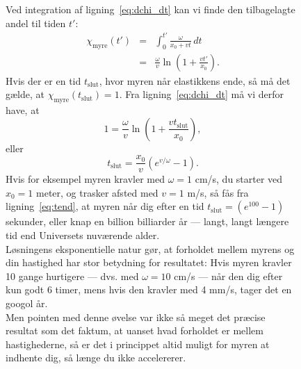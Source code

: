 \documentclass[useAMS,danish]{aa}
\begin{document}
\begin{figure}[!t]
\begin{bclogo}[
    couleur=gray!20,
    epBord=1,
    arrondi=0.1,
    logo=\bcinfo,
    marge=8,
    ombre=false, %
    couleurBord=gray!60,
    barre=line]
{{    Ved integration af ligning~\ref{eq:dchi_dt} kan vi finde den tilbagelagte andel til tiden $t'$:
    \begin{eqnarray}
        \label{eq:chit}
        \nonumber
        \chi_\mathrm{myre}(t') & = & \int_0^{t'} \frac{\omega}{x_0 + v t} \, dt\\
                               & = & \frac{\omega}{v} \ln \left(1+\frac{vt'}{x_0}\right).
    \end{eqnarray}
    Hvis der er en tid $t_\mathrm{slut}$, hvor myren når elastikkens ende, så må det gælde, at $\chi_\mathrm{myre}(t_\mathrm{slut}) = 1$.
    Fra ligning~\ref{eq:dchi_dt} må vi derfor have, at
    \begin{equation}
        \nonumber
        1 = \frac{\omega}{v} \ln\left(1+\frac{vt_\mathrm{slut}}{x_0}\right),
    \end{equation}
    eller
    \begin{equation}
        \label{eq:tend}
        t_\mathrm{slut}=\frac {x_0}{v}\left(e^{v/\omega}-1\right).
    \end{equation}
    Hvis for eksempel myren kravler med $\omega = 1$ cm/s, du starter ved $x_0 = 1$ meter, og trasker afsted med $v = 1$ m/s, så fås fra ligning~\ref{eq:tend}, at myren når dig efter en tid $t_\mathrm{slut} = (e^{100}-1)$ sekunder, eller knap en billion billiarder år --- langt, langt længere tid end Universets nuværende alder.
    \vspace{1mm}\\
    Løsningens eksponentielle natur gør, at forholdet mellem myrens og din hastighed har stor betydning for resultatet:
    Hvis myren kravler 10 gange hurtigere --- dvs. med $\omega = 10$ cm/s --- når den dig efter kun godt 6 timer, mens hvis den kravler med 4 mm/s, tager det en googol år.
    \vspace{1mm}\\
    Men pointen med denne øvelse var ikke så meget det præcise resultat som det faktum, at uanset hvad forholdet er mellem hastighederne, så er det i princippet altid muligt for myren at indhente dig, så længe du ikke accelererer.
    }}
\label{info:myre}
\end{bclogo}
     \endminipage
\end{figure}
\end{document}
